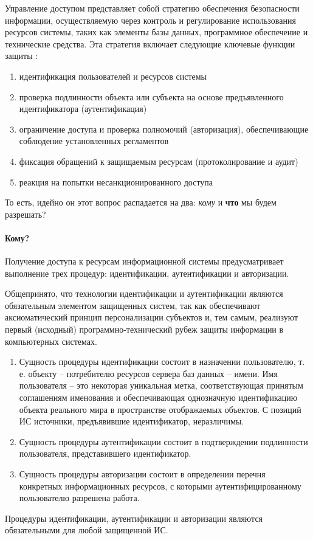 Управление доступом представляет собой стратегию обеспечения безопасности информации, осуществляемую через контроль и регулирование использования ресурсов системы, таких как элементы базы данных, программное обеспечение и технические средства. Эта стратегия включает следующие ключевые функции защиты \autocite[с. 36]{Skakun}:
\begin{enumerate}
	\item идентификация пользователей и ресурсов системы
	\item проверка подлинности объекта или субъекта на основе предъявленного идентификатора (аутентификация)
	\item ограничение доступа и проверка полномочий (авторизация), обеспечивающие соблюдение установленных регламентов
	\item фиксация обращений к защищаемым ресурсам (протоколирование и аудит)
	\item реакция на попытки несанкционированного доступа
\end{enumerate}
То есть, идейно он этот вопрос распадается на два: \textit{кому} и \textbf{что} мы будем разрешать?

\paragraph{Кому?}

Получение доступа к ресурсам информационной системы предусматривает выполнение трех процедур: идентификации, аутентификации и авторизации.

Общепринято, что технологии идентификации и аутентификации являются обязательным элементом защищенных систем, так как обеспечивают аксиоматический принцип персонализации субъектов и, тем самым, реализуют первый (исходный) программ­но-технический рубеж защиты информации в компьютерных системах.

\begin{enumerate}
	\item Сущность процедуры идентификации состоит в назначении пользователю, т. е. объекту -- потребителю ресурсов сервера баз данных -- имени. Имя пользователя -- это некоторая уникальная метка, соответствующая принятым соглашениям именования и обеспечивающая однозначную идентификацию объекта реального мира в пространстве отображаемых объектов. С позиций ИС источники, предъявившие идентификатор, неразличимы.
	\item Сущность процедуры аутентификации состоит в подтверждении подлинности пользователя, представившего идентификатор.
	\item Сущность процедуры авторизации состоит в определении перечня конкретных информационных ресурсов, с которыми аутентифицированному пользователю разрешена работа.

\end{enumerate}
Процедуры идентификации, аутентификации и авторизации являются обязательными для любой защищенной ИС.

